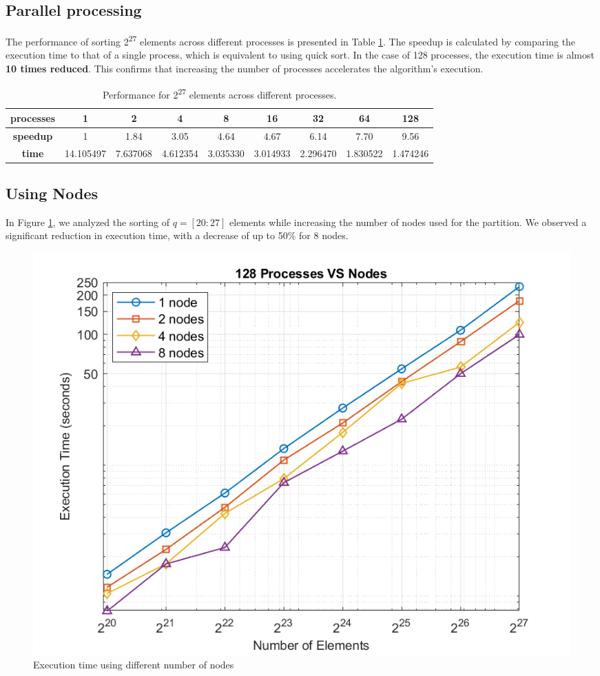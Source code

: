 \documentclass{article}
\begin{document}
\subsection{Parallel processing}
The performance of sorting 2\textsuperscript{27} elements across different processes is presented in Table \ref{tab:acceleration}. The speedup is calculated by comparing the execution time to that of a single process, which is equivalent to using quick sort. In the case of 128 processes, the execution time is almost \textbf{10 times reduced}. This confirms that increasing the number of processes accelerates the algorithm's execution.
\begin{table}[h!]
\centering
\begin{tabular}{|c|c|c|c|c|c|c|c|c|}
\hline
\textbf{processes} & 1 & 2 & 4 & 8 & 16 & 32 & 64 & 128 \\
\hline
\textbf{speedup} & 1 & 1.84 & 3.05 & 4.64 & 4.67 & 6.14& 7.70 & 9.56 \\
\hline
\textbf{time} & 14.105497 & 7.637068 & 4.612354 & 3.035330 & 3.014933 & 2.296470 & 1.830522 & 1.474246 \\
\hline
\end{tabular}
\caption{Performance for 2\textsuperscript{27} elements across different processes.}
\label{tab:acceleration}
\end{table}

\subsection{Using Nodes}
In Figure \ref{fig:proc vs nodes}, we analyzed the sorting of $q = [20:27]$ elements while increasing the number of nodes used for the partition. We observed a significant reduction in execution time, with a decrease of up to 50\% for 8 nodes.

\begin{figure}[h!]
    \centering
    \includegraphics[width=1\linewidth]{execution_time_vs_elements.png}
    \caption{Execution time using different number of nodes}
    \label{fig:proc vs nodes}
\end{figure}
\end{document}
